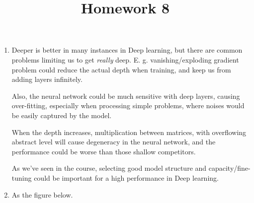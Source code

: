 \documentclass[
]{article}
\author{}
\date{}
\begin{document}
\title{Homework 8}
\maketitle
\begin{enumerate}
\def\labelenumi{\arabic{enumi}.}
\item
  Deeper is better in many instances in Deep learning, but there are
  common problems limiting us to get \emph{really} deep. E. g. 
  vanishing/exploding gradient problem could reduce the actual depth when
  training, and keep us from adding layers infinitely.

  Also, the neural network could be much sensitive with deep layers,
  causing over-fitting, especially when processing simple problems,
  where noises would be easily captured by the model.

  When the depth increases, multiplication between matrices, with
  overflowing abstract level will cause degeneracy in the neural
  network, and the performance could be worse than those shallow
  competitors.

  As we've seen in the course, selecting good model structure and
  capacity/fine-tuning could be important for a high performance in
  Deep learning.
\item
  As the figure below.
  \begin{figure}[ht]
    \centering
\end{figure}
\end{enumerate}
\end{document}
